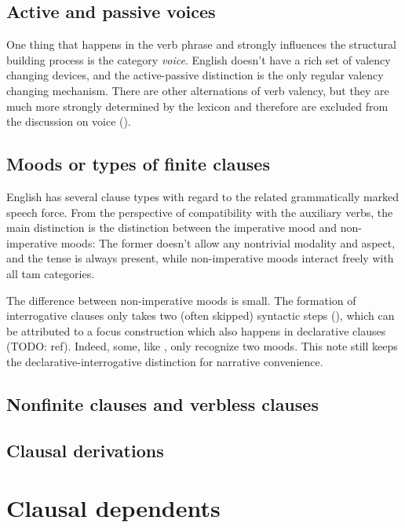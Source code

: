 \documentclass[UTF8, a4paper, oneside, scheme=plain]{ctexrep}
\newcommand*{\citepage}[1]{pp.~{#1}}
\begin{document}
\subsection{Active and passive voices}

One thing that happens in the verb phrase 
and strongly influences the structural building process is the category \emph{voice}.
English doesn't have a rich set of valency changing devices,
and the active-passive distinction is the only regular valency changing mechanism.
There are other alternations of verb valency, 
but they are much more strongly determined by the lexicon 
and therefore are excluded from the discussion on voice ().

\subsection{Moods or types of finite clauses}\label{sec:moods}

English has several clause types with regard to the related grammatically marked speech force.
From the perspective of compatibility with the auxiliary verbs,
the main distinction is the distinction between the imperative mood and non-imperative moods:
The former doesn't allow any nontrivial modality and aspect,
and the tense is always present,
while non-imperative moods interact freely with all \acs{tam} categories.

The difference between non-imperative moods is small.
The formation of interrogative clauses 
only takes two (often skipped) syntactic steps 
(),
which can be attributed to a focus construction which also happens in declarative clauses (TODO: ref).
Indeed, some, like \citet[\citepage{25}]{dixon2005semantic}, only recognize two moods.
This note still keeps the declarative-interrogative distinction 
for narrative convenience.

\subsection{Nonfinite clauses and verbless clauses}\label{sec:simple-clause.nonfinite-clause}

\subsection{Clausal derivations}\label{sec:simple-clause.derivation}

\section{Clausal dependents}\label{sec:simple-clause.dependents}
\end{document}
